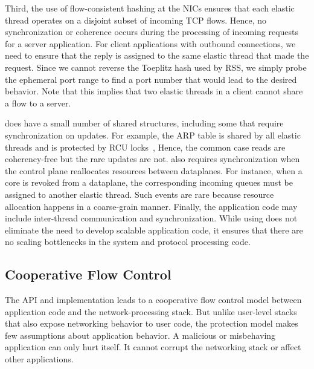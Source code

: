 Third, the use of flow-consistent hashing at the NICs ensures that
each elastic thread operates on a disjoint subset of incoming TCP
flows. Hence, no synchronization or coherence occurs during the
processing of incoming requests for a server application. For client
applications with outbound connections, we need to ensure that the
reply is assigned to the same elastic thread that made the
request. Since we cannot reverse the Toeplitz hash used by RSS, we
simply probe the ephemeral port range to find a port number that
would lead to the desired behavior. Note that this implies that two
elastic threads in a client cannot share a flow to a server. %
 




\ix does have a small number of shared structures, including some that
require synchronization on updates.  For example, the ARP table is
shared by all elastic threads and is protected by RCU
locks~\cite{mckenney1998read}, Hence, the common case reads are
coherency-free but the rare updates are not. \ix also requires
synchronization when the control plane reallocates resources between
dataplanes.  For instance, when a core is revoked from a dataplane,
the corresponding incoming queues must be assigned to another elastic
thread. Such events are rare because resource allocation happens in a
coarse-grain manner. Finally, the application code may include
inter-thread communication and synchronization. While using \ix does
not eliminate the need to develop scalable application code, it
ensures that there are no scaling bottlenecks in the system and
protocol processing code. 

\subsection{Cooperative Flow Control}
\label{sec:impl:coop}


The \ix API and implementation leads to a cooperative flow control
model between application code and the network-processing stack.  But
unlike user-level stacks that also expose networking behavior to user
code, the \ix protection model makes few assumptions about application
behavior. A malicious or misbehaving application can only hurt
itself. It cannot corrupt the networking stack or affect other
applications.

